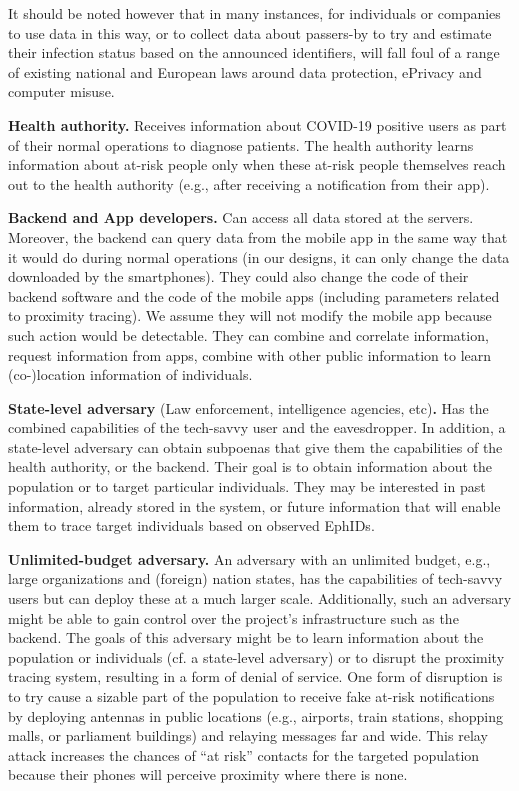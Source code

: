 \documentclass{article}
\begin{document}
It should be noted however that in many instances, for individuals or
companies to use data in this way, or to collect data about passers-by
to try and estimate their infection status based on the announced
identifiers, will fall foul of a range of existing national and European
laws around data protection, ePrivacy and computer misuse.

\textbf{Health authority.} Receives information about COVID-19 positive
users as part of their normal operations to diagnose patients. The
health authority learns information about at-risk people only when these
at-risk people themselves reach out to the health authority (e.g., after
receiving a notification from their app).

\textbf{Backend and App developers.} Can access all data stored at the
servers. Moreover, the backend can query data from the mobile app in the
same way that it would do during normal operations (in our designs, it
can only change the data downloaded by the smartphones). They could also
change the code of their backend software and the code of the mobile
apps (including parameters related to proximity tracing). We assume they
will not modify the mobile app because such action would be detectable.
They can combine and correlate information, request information from
apps, combine with other public information to learn (co-)location
information of individuals.

\textbf{State-level adversary} (Law enforcement, intelligence agencies,
etc)\textbf{.} Has the combined capabilities of the tech-savvy user and
the eavesdropper. In addition, a state-level adversary can obtain
subpoenas that give them the capabilities of the health authority, or
the backend. Their goal is to obtain information about the population or
to target particular individuals. They may be interested in past
information, already stored in the system, or future information that
will enable them to trace target individuals based on observed EphIDs.

\textbf{Unlimited-budget adversary.} An adversary with an unlimited
budget, e.g., large organizations and (foreign) nation states, has the
capabilities of tech-savvy users but can deploy these at a much larger
scale. Additionally, such an adversary might be able to gain control
over the project's infrastructure such as the backend. The goals of this
adversary might be to learn information about the population or
individuals (cf. a state-level adversary) or to disrupt the proximity
tracing system, resulting in a form of denial of service. One form of
disruption is to try cause a sizable part of the population to receive
fake at-risk notifications by deploying antennas in public locations
(e.g., airports, train stations, shopping malls, or parliament
buildings) and relaying messages far and wide. This relay attack
increases the chances of ``at risk'' contacts for the targeted
population because their phones will perceive proximity where there is
none.
\end{document}
